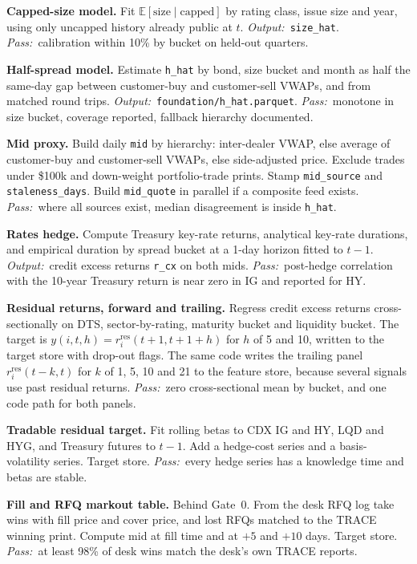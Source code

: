 \documentclass[11pt,letterpaper]{article}
\makeatletter
\newcommand{\code}[1]{\texttt{#1}}
\newcommand{\E}{\mathbb{E}}
\newcommand{\rres}{r^{\mathrm{res}}}      %
\newcommand*{\twodigit}[1]{\expandafter\@twodigit\csname c@#1\endcsname}
\newcommand*{\@twodigit}[1]{\ifnum#1<10 0\fi\number#1}
\newcommand{\stepname}[1]{\textbf{#1.}}
\newcommand{\Out}{\textit{Output:}~}
\newcommand{\Pass}{\textit{Pass:}~}
\makeatother
\begin{document}
\begin{ladder}[label=\textbf{F\twodigit*}]
\item \stepname{Capped-size model} Fit $\E[\text{size}\mid\text{capped}]$ by rating class, issue size and year, using only uncapped history already public at $t$. \Out \code{size_hat}. \Pass calibration within 10\% by bucket on held-out quarters.
\item \stepname{Half-spread model} Estimate \code{h_hat} by bond, size bucket and month as half the same-day gap between customer-buy and customer-sell VWAPs, and from matched round trips. \Out \code{foundation/h_hat.parquet}. \Pass monotone in size bucket, coverage reported, fallback hierarchy documented.
\item \stepname{Mid proxy} Build daily \code{mid} by hierarchy: inter-dealer VWAP, else average of customer-buy and customer-sell VWAPs, else side-adjusted price. Exclude trades under \$100k and down-weight portfolio-trade prints. Stamp \code{mid_source} and \code{staleness_days}. Build \code{mid_quote} in parallel if a composite feed exists. \Pass where all sources exist, median disagreement is inside \code{h_hat}.
\item \stepname{Rates hedge} Compute Treasury key-rate returns, analytical key-rate durations, and empirical duration by spread bucket at a 1-day horizon fitted to $t-1$. \Out credit excess returns \code{r_cx} on both mids. \Pass post-hedge correlation with the 10-year Treasury return is near zero in IG and reported for HY.
\item \stepname{Residual returns, forward and trailing} Regress credit excess returns cross-sectionally on DTS, sector-by-rating, maturity bucket and liquidity bucket. The target is $y(i,t,h)=\rres_i(t+1,t+1+h)$ for $h$ of 5 and 10, written to the target store with drop-out flags. The same code writes the trailing panel $\rres_i(t-k,t)$ for $k$ of 1, 5, 10 and 21 to the feature store, because several signals use past residual returns. \Pass zero cross-sectional mean by bucket, and one code path for both panels.
\item \stepname{Tradable residual target} Fit rolling betas to CDX IG and HY, LQD and HYG, and Treasury futures to $t-1$. Add a hedge-cost series and a basis-volatility series. Target store. \Pass every hedge series has a knowledge time and betas are stable.
\item \stepname{Fill and RFQ markout table} Behind Gate~0. From the desk RFQ log take wins with fill price and cover price, and lost RFQs matched to the TRACE winning print. Compute mid at fill time and at $+5$ and $+10$ days. Target store. \Pass at least 98\% of desk wins match the desk's own TRACE reports.

\end{ladder}
\end{document}
